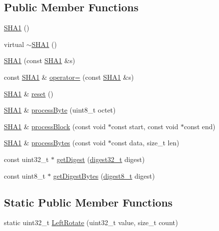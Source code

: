 \subsection*{Public Member Functions}
\begin{DoxyCompactItemize}
\item 
\hyperlink{classsha1_1_1_s_h_a1_a440d0c3f17da510418b678f4c9dcbdf2}{S\-H\-A1} ()
\item 
virtual \hyperlink{classsha1_1_1_s_h_a1_a7103b57eb1f51a498a92c095b9c21392}{$\sim$\-S\-H\-A1} ()
\item 
\hyperlink{classsha1_1_1_s_h_a1_a1d63d04a7f146a42000e0a2a35314c6f}{S\-H\-A1} (const \hyperlink{classsha1_1_1_s_h_a1}{S\-H\-A1} \&s)
\item 
const \hyperlink{classsha1_1_1_s_h_a1}{S\-H\-A1} \& \hyperlink{classsha1_1_1_s_h_a1_ae8f2ccbee9a15968482057e0d03a4247}{operator=} (const \hyperlink{classsha1_1_1_s_h_a1}{S\-H\-A1} \&s)
\item 
\hyperlink{classsha1_1_1_s_h_a1}{S\-H\-A1} \& \hyperlink{classsha1_1_1_s_h_a1_ae2f5530e5be0837e6a222a1f244cbe6d}{reset} ()
\item 
\hyperlink{classsha1_1_1_s_h_a1}{S\-H\-A1} \& \hyperlink{classsha1_1_1_s_h_a1_a8f7edf8ccfea07f988d5f40c4b5c768b}{process\-Byte} (uint8\-\_\-t octet)
\item 
\hyperlink{classsha1_1_1_s_h_a1}{S\-H\-A1} \& \hyperlink{classsha1_1_1_s_h_a1_af5e58568ad3bcaf91640c7fd5e448d85}{process\-Block} (const void $\ast$const start, const void $\ast$const end)
\item 
\hyperlink{classsha1_1_1_s_h_a1}{S\-H\-A1} \& \hyperlink{classsha1_1_1_s_h_a1_abf8a680503b98b8f773f98752e34dbca}{process\-Bytes} (const void $\ast$const data, size\-\_\-t len)
\item 
const uint32\-\_\-t $\ast$ \hyperlink{classsha1_1_1_s_h_a1_a7a097712264451da60aa0f30096dd516}{get\-Digest} (\hyperlink{classsha1_1_1_s_h_a1_a15f384f39d235a8912d5042dc920595f}{digest32\-\_\-t} digest)
\item 
const uint8\-\_\-t $\ast$ \hyperlink{classsha1_1_1_s_h_a1_a4fd38b624cba611b65730a9e747c584e}{get\-Digest\-Bytes} (\hyperlink{classsha1_1_1_s_h_a1_a62b6c7838c4cdcb81700a6cc64fde994}{digest8\-\_\-t} digest)
\end{DoxyCompactItemize}
\subsection*{Static Public Member Functions}
\begin{DoxyCompactItemize}
\item 
static uint32\-\_\-t \hyperlink{classsha1_1_1_s_h_a1_a88fa19fad6a3b06522b2826a5966f355}{Left\-Rotate} (uint32\-\_\-t value, size\-\_\-t count)
\end{DoxyCompactItemize}
